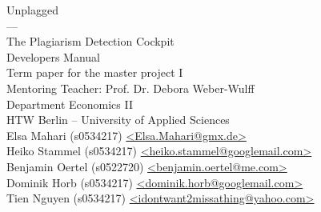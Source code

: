 \begin{titlepage}
\vspace*{2cm}

\begin{center}
\Huge
Unplagged\\
---\\
\large
The Plagiarism Detection Cockpit\\
Developers Manual\\
\vfill
Term paper for the master project I \\ Mentoring Teacher: Prof. Dr. Debora Weber-Wulff\\
\vspace{1cm}
\normalsize
Department Economics II\\
HTW Berlin -- University of Applied Sciences\\

\vspace{4mm}
Elsa Mahari (s0534217) \href{mailto:elsa.mahari@gmx.de}{\textless Elsa.Mahari@gmx.de\textgreater}\\
Heiko Stammel (s0534217) \href{mailto:heiko.stammel@googlemail.com}{\textless heiko.stammel@googlemail.com\textgreater}\\
Benjamin Oertel (s0522720) \href{mailto:benjamin.oertel@me.com}{\textless benjamin.oertel@me.com\textgreater}\\
Dominik Horb (s0534217) \href{mailto:dominik.horb@googlemail.com}{\textless dominik.horb@googlemail.com\textgreater}\\
Tien Nguyen (s0534217) \href{mailto:idontwant2missathing@yahoo.com}{\textless idontwant2missathing@yahoo.com\textgreater}\\


\end{center}
\end{titlepage}